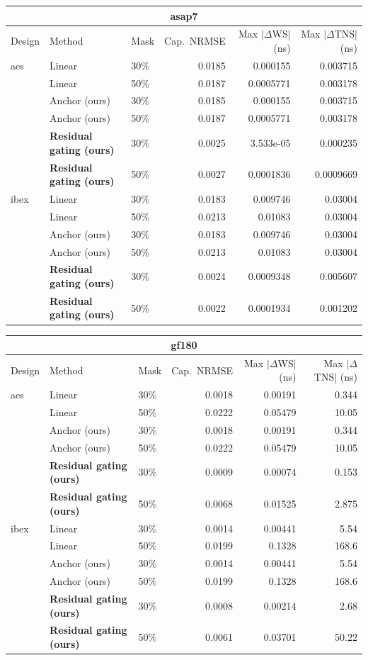 \small
\begin{tabular}{lllrrr}\toprule
\multicolumn{6}{c}{asap7} \\\midrule
Design & Method & Mask & Cap.\ NRMSE & Max $|\Delta$WS| (ns) & Max $|\Delta$TNS| (ns) \\\midrule
aes & Linear & 30\% & 0.0185 & 0.000155 & 0.003715 \\
 & Linear & 50\% & 0.0187 & 0.0005771 & 0.003178 \\
 & Anchor (ours) & 30\% & 0.0185 & 0.000155 & 0.003715 \\
 & Anchor (ours) & 50\% & 0.0187 & 0.0005771 & 0.003178 \\
 & \textbf{Residual gating (ours)} & 30\% & 0.0025 & 3.533e-05 & 0.000235 \\
 & \textbf{Residual gating (ours)} & 50\% & 0.0027 & 0.0001836 & 0.0009669 \\
\addlinespace
ibex & Linear & 30\% & 0.0183 & 0.009746 & 0.03004 \\
 & Linear & 50\% & 0.0213 & 0.01083 & 0.03004 \\
 & Anchor (ours) & 30\% & 0.0183 & 0.009746 & 0.03004 \\
 & Anchor (ours) & 50\% & 0.0213 & 0.01083 & 0.03004 \\
 & \textbf{Residual gating (ours)} & 30\% & 0.0024 & 0.0009348 & 0.005607 \\
 & \textbf{Residual gating (ours)} & 50\% & 0.0022 & 0.0001934 & 0.001202 \\
\bottomrule\end{tabular}

\vspace{2pt}

\begin{tabular}{lllrrr}\toprule
\multicolumn{6}{c}{gf180} \\\midrule
Design & Method & Mask & Cap.\ NRMSE & Max $|\Delta$WS| (ns) & Max $|\Delta$TNS| (ns) \\\midrule
aes & Linear & 30\% & 0.0018 & 0.00191 & 0.344 \\
 & Linear & 50\% & 0.0222 & 0.05479 & 10.05 \\
 & Anchor (ours) & 30\% & 0.0018 & 0.00191 & 0.344 \\
 & Anchor (ours) & 50\% & 0.0222 & 0.05479 & 10.05 \\
 & \textbf{Residual gating (ours)} & 30\% & 0.0009 & 0.00074 & 0.153 \\
 & \textbf{Residual gating (ours)} & 50\% & 0.0068 & 0.01525 & 2.875 \\
\addlinespace
ibex & Linear & 30\% & 0.0014 & 0.00441 & 5.54 \\
 & Linear & 50\% & 0.0199 & 0.1328 & 168.6 \\
 & Anchor (ours) & 30\% & 0.0014 & 0.00441 & 5.54 \\
 & Anchor (ours) & 50\% & 0.0199 & 0.1328 & 168.6 \\
 & \textbf{Residual gating (ours)} & 30\% & 0.0008 & 0.00214 & 2.68 \\
 & \textbf{Residual gating (ours)} & 50\% & 0.0061 & 0.03701 & 50.22 \\
\bottomrule\end{tabular}
